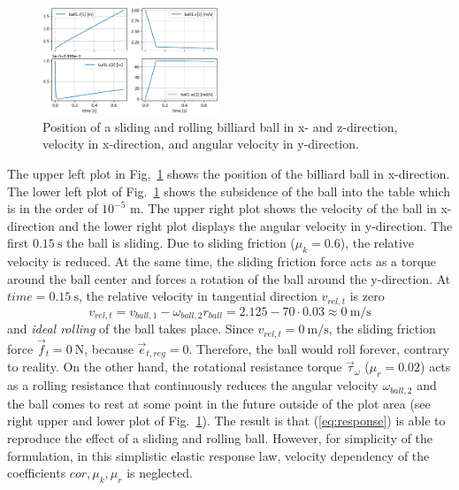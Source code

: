 %
\begin{figure}[tb]
	\centering
	\includegraphics[width=0.47\textwidth]{figures/rollingBall_plot.pdf}
	\caption{Position of a sliding and rolling billiard ball in x- and z-direction, velocity in x-direction, and angular velocity in y-direction.}
	\label{fig:rollingBall_plot}
\end{figure}
%
The upper left plot in Fig,~\ref{fig:rollingBall_plot} shows the position of the billiard ball in x-direction. 
The lower left plot of Fig.~\ref{fig:rollingBall_plot} shows the subsidence of the ball into the table 
which is in the order of $10^{-5}$ m. The upper right plot shows the velocity of the ball in 
x-direction and the lower right plot displays the angular velocity in y-direction.
The first $\SI{0.15}{\second}$ the ball is sliding. Due to sliding friction ($\mu_k = 0.6$), the relative velocity is reduced.
At the same time, the sliding friction force acts as a torque around the ball center and forces a rotation of
the ball around the y-direction. At $time = \SI{0.15}{\second}$, the relative velocity in tangential direction $v_{rel,t}$ is zero 
\begin{equation}
v_{rel,t} = v_{ball,1} - \omega_{ball,2} r_{ball} = 2.125 - 70 \cdot 0.03 \approx \SI{0}{\meter \per \second}
\end{equation}
and \emph{ideal rolling} of the ball takes place. Since $v_{rel,t} =\SI{0}{\meter \per \second}$, the sliding friction force
$\vec{f}_t = \SI{0}{\newton}$, because $\vec{e}_{t,reg}= 0$. Therefore, the ball would roll forever, contrary to reality.
On the other hand, the rotational resistance torque $\vec{\tau}_{\omega}$ ($\mu_r = 0.02$) acts as a
rolling resistance that continuously reduces the
angular velocity $\omega_{ball,2}$ and the ball comes to rest at 
some point in the future outside of the plot area (see right upper and lower plot of 
Fig.~\ref{fig:rollingBall_plot}). The result is that
(\ref{eq:response}) is able to reproduce the effect of a sliding and rolling 
ball. However, for simplicity of the formulation, in this simplistic elastic
response law, velocity dependency of the coefficients $cor, \mu_k, \mu_r$ is neglected.


